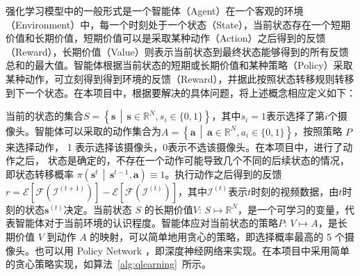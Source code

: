 强化学习模型中的一般形式是一个智能体（Agent）在一个客观的环境（Environment）中，每一个时刻处于一个状态（State），当前状态存在一个短期价值和长期价值，短期价值可以是采取某种动作（Action）之后得到的反馈（Reward），长期价值（Value）则表示当前状态到最终状态能够得到的所有反馈总和的最大值。智能体根据当前状态的短期或长期价值和某种策略（Policy）采取某种动作，可立刻得到得到环境的反馈（Reward），并据此按照状态转移规则转移到下一个状态。在本项目中，根据要解决的具体问题，将上述概念相应定义如下：

当前的状态的集合$S=\left\{\boldsymbol{s}\,\middle\vert\,\boldsymbol{s}\in\mathbb{R}^{N}, s_i\in\{0, 1\}\right\}$，其中$s_i=1$表示选择了第$i$个摄像头。智能体可以采取的动作集合为$A=\left\{\boldsymbol{a}\,\middle\vert\,\boldsymbol{a}\in\mathbb{R}^N,a_i \in \{0,1\}\right\}$，按照策略 $P$ 来选择动作， 1 表示选择该摄像头，0表示不选该摄像头。在本项目中，进行了动作之后， 状态是确定的，不存在一个动作可能导致几个不同的后续状态的情况，即状态转移概率 $\pi\left(\boldsymbol{s}^t\,\middle\vert\,\boldsymbol{s}^{t-1}, \boldsymbol{a}\right)\equiv1$。执行动作之后得到的反馈$r=\mathcal{E}\left[\mathcal{F}\left(\mathcal{I}^{(t+1)}\right)\right]-\mathcal{E}\left[\mathcal{F}\left(\mathcal{I}^{(t)}\right)\right]$，其中$\mathcal{I}^{(t)}$表示$t$时刻的视频数据，由$t$时刻的状态$\boldsymbol{s}^{(t)}$决定。当前状态 $S$ 的长期价值$V:\,S\mapsto\mathbb{R}^N$，是一个可学习的变量，代表智能体对于当前环境的认识程度。智能体应对当前状态的策略$P:\,V\mapsto A$，是长期价值 $V$ 到动作 $A$ 的映射，可以简单地用贪心的策略，即选择概率最高的 5 个摄像头。也可以用 Policy Network ，即深度神经网络来实现。在本项目中采用简单的贪心策略实现，如算法~\ref{alg:qlearning}~所示。

